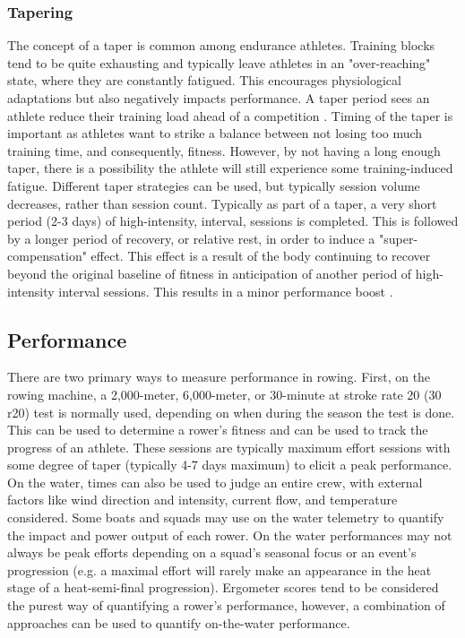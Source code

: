 \subsubsection{Tapering}
The concept of a taper is common among endurance athletes. Training blocks tend to be quite exhausting and typically leave athletes in an "over-reaching" state, where they are constantly fatigued. This encourages physiological adaptations but also negatively impacts performance. A taper period sees an athlete reduce their training load ahead of a competition \cite{Lawton2023}. Timing of the taper is important as athletes want to strike a balance between not losing too much training time, and consequently, fitness. However, by not having a long enough taper, there is a possibility the athlete will still experience some training-induced fatigue. Different taper strategies can be used, but typically session volume decreases, rather than session count. Typically as part of a taper, a very short period (2-3 days) of high-intensity, interval, sessions is completed. This is followed by a longer period of recovery, or relative rest, in order to induce a "super-compensation" effect. This effect is a result of the body continuing to recover beyond the original baseline of fitness in anticipation of another period of high-intensity interval sessions. This results in a minor performance boost \cite{Kanwetz2016}.


\subsection{Performance}
There are two primary ways to measure performance in rowing. First, on the rowing machine, a 2,000-meter, 6,000-meter, or 30-minute at stroke rate 20 (30 r20) test is normally used, depending on when during the season the test is done. This can be used to determine a rower's fitness and can be used to track the progress of an athlete. These sessions are typically maximum effort sessions with some degree of taper (typically 4-7 days maximum) to elicit a peak performance. On the water, times can also be used to judge an entire crew, with external factors like wind direction and intensity, current flow, and temperature considered. Some boats and squads may use on the water telemetry to quantify the impact and power output of each rower. On the water performances may not always be peak efforts depending on a squad's seasonal focus or an event's progression (e.g. a maximal effort will rarely make an appearance in the heat stage of a heat-semi-final progression). Ergometer scores tend to be considered the purest way of quantifying a rower's performance, however, a combination of approaches can be used to quantify on-the-water performance.


